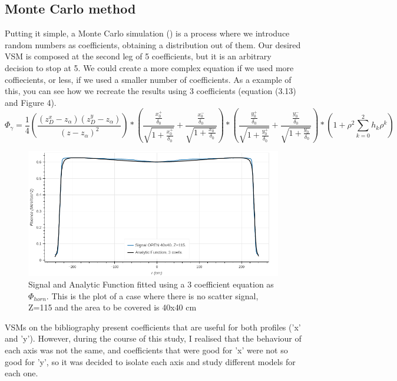 \documentclass[openany]{article}
\begin{document}
\subsection{Monte Carlo method}

Putting it simple, a Monte Carlo simulation (\cite{Kroese2014WhyTM}) is a process where we introduce random numbers as coefficients, obtaining a distribution out of them. Our desired VSM is composed at the second leg of 5 coefficients, but it is an arbitrary decision to stop at 5. We could create a more complex equation if we used more coffiecients, or less, if we used a smaller number of coefficients. As a example of this, you can see how we recreate the results using 3 coefficients (equation (3.13) and Figure 4). \\

\begin{equation}
    \Phi_\gamma = \frac{1}{4} (\frac{(z_D^x - z_\alpha) (z^y_D - z_\alpha )}{(z-z_\alpha)^2})*(\frac{\frac{x_0^+}{\delta_0}}{\sqrt{1+\frac{x_0^+}{\delta_0}}} + \frac{\frac{x_0^-}{\delta_0}}{\sqrt{1+\frac{x_0^-}{\delta_0}}}) * (\frac{\frac{y_0^+}{\delta_0}}{\sqrt{1+\frac{y_0^+}{\delta_0}}} + \frac{\frac{y_0^-}{\delta_0}}{\sqrt{1+\frac{y_0^-}{\delta_0}}}) * ( 1+ \rho^2 \sum_{k=0}^2 h_k \rho^k)
\end{equation}

\newpage 


\begin{figure}[!h]
    \centering
    \includegraphics[width=\textwidth]{3Coefs.png}
    \caption{Signal and Analytic Function fitted using a 3 coefficient equation as \(\Phi_{horn}\). This is the plot of a case where there is no scatter signal, Z=115 and the area to be covered is 40x40 cm}
    \label{fig:my_label}
\end{figure}

VSMs on the bibliography present coefficients that are useful for both profiles ('x' and 'y'). However, during the course of this study, I realised that the behaviour of each axis was not the same, and coefficients that were good for 'x' were not so good for 'y', so it was decided to isolate each axis and study different models for each one. \\
\end{document}
